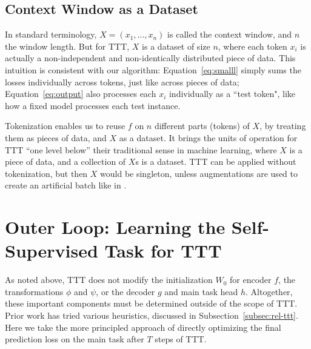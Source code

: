 \documentclass{article} %
\begin{document}
\subsection{Context Window as a Dataset}
\label{subsec:context}
In standard terminology, $X = (x_1, \dots, x_n)$ is called the context window, and $n$ the window length.
But for TTT, $X$ is a dataset of size $n$, where each token $x_i$ is actually a non-independent and non-identically distributed piece of data.
This intuition is consistent with our algorithm: Equation~\ref{eq:smalll} simply sums the losses individually across tokens, just like across pieces of data;
Equation~\ref{eq:output} also processes each $x_i$ individually as a ``test token", like how a fixed model processes each test instance.
 
Tokenization enables us to reuse $f$ on $n$ different parts (tokens) of $X$, by treating them as pieces of data, and $X$ as a dataset.
It brings the units of operation for TTT ``one level below'' their traditional sense in machine learning, where $X$ is a piece of data, and a collection of $X$s is a dataset.
TTT can be applied without tokenization, but then $X$ would be singleton, unless augmentations are used to create an artificial batch like in \cite{sun2020test}.


\section{Outer Loop: Learning the Self-Supervised Task for TTT}
\label{sec:method}
As noted above, TTT does not modify 
the initialization $W_0$ for encoder $f$, 
the transformations $\phi$ and $\psi$, or the decoder $g$ and main task head $h$.
Altogether, these important components must be determined outside of the scope of TTT.
Prior work has tried various heuristics, discussed in Subsection~\ref{subsec:rel-ttt}.
Here we take the more principled approach of directly optimizing the final prediction loss on the main task after $T$ steps of TTT.
\end{document}
